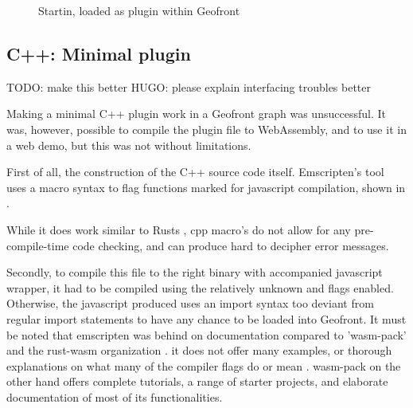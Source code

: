 \begin{figure}
\begin{subfigure}[b]{0.90\linewidth}
  \end{subfigure}%
  \caption[Types of \ac{vpl}s]{Startin, loaded as plugin within Geofront}%
  \label{fig:startin-plugin}
  \end{figure}

\subsection{C++: Minimal plugin}  

\begin{note}
  TODO: make this better
  HUGO: please explain interfacing troubles better
\end{note}

Making a minimal C++ plugin work in a Geofront graph was unsuccessful.
It was, however, possible to compile the plugin file to WebAssembly, and to use it in a web demo, but this was not without limitations. 

First of all, the construction of the C++ source code itself.
Emscripten's  tool uses a macro syntax to flag functions marked for javascript compilation, shown in . 

While it does work similar to Rusts , cpp macro's do not allow for any pre-compile-time code checking, and can produce hard to decipher error messages. 

Secondly, to compile this file to the right binary with accompanied javascript wrapper, it had to be compiled using the relatively unknown  and  flags enabled.
Otherwise, the javascript produced uses an import syntax too deviant from regular import statements to have any chance to be loaded into Geofront. 
It must be noted that emscripten was behind on documentation compared to 'wasm-pack' and the rust-wasm organization \citep{contributors_wasm-pack_2022}. 
it does not offer many examples, or thorough explanations on what many of the compiler flags do or mean \citep{emscripten_organization_emscripten_2022}.
wasm-pack on the other hand offers complete tutorials, a range of starter projects, and elaborate documentation of most of its functionalities. 

